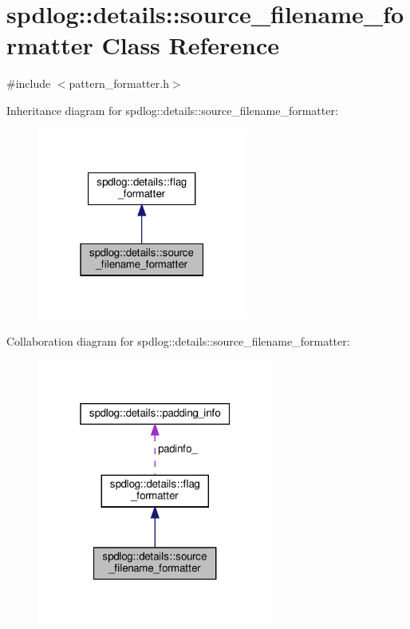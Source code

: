 \hypertarget{classspdlog_1_1details_1_1source__filename__formatter}{}\section{spdlog\+:\+:details\+:\+:source\+\_\+filename\+\_\+formatter Class Reference}
\label{classspdlog_1_1details_1_1source__filename__formatter}


{\ttfamily \#include $<$pattern\+\_\+formatter.\+h$>$}



Inheritance diagram for spdlog\+:\+:details\+:\+:source\+\_\+filename\+\_\+formatter\+:
\nopagebreak
\begin{figure}[H]
\begin{center}
\leavevmode
\includegraphics[width=195pt]{classspdlog_1_1details_1_1source__filename__formatter__inherit__graph}
\end{center}
\end{figure}


Collaboration diagram for spdlog\+:\+:details\+:\+:source\+\_\+filename\+\_\+formatter\+:
\nopagebreak
\begin{figure}[H]
\begin{center}
\leavevmode
\includegraphics[width=220pt]{classspdlog_1_1details_1_1source__filename__formatter__coll__graph}
\end{center}
\end{figure}

